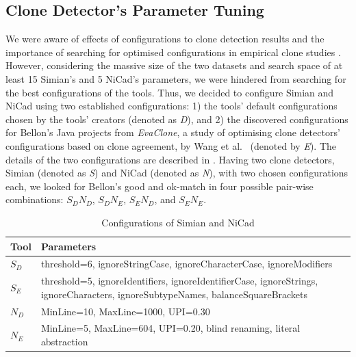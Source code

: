 \documentclass{sig-alternate-05-2015}
\begin{document}
\subsection{Clone Detector's Parameter Tuning}
We were aware of effects of configurations to clone detection results and the importance of searching for optimised configurations in empirical clone studies \cite{Wang2014,cr2016ssbse,Ragkhitwetsagul2016,Svajlenko2014}. However, considering the massive size of the two datasets and search space of at least 15 Simian's and 5 NiCad's parameters, we were hindered from searching for the best configurations of the tools. Thus, we decided to configure Simian and NiCad using two established configurations: 1) the tools' default configurations chosen by the tools' creators (denoted as \textit{D}), and 2) the discovered configurations for Bellon's Java projects from \textit{EvaClone}, a study of optimising clone detectors' configurations based on clone agreement, by Wang et al.~\cite{Wang2013} (denoted by \textit{E}). The details of the two configurations are described in . Having two clone detectors, Simian (denoted as \textit{S}) and NiCad (denoted as \textit{N}), with two chosen configurations each, we looked for Bellon's good and ok-match in four possible pair-wise combinations: $S_{D}N_{D}$, $S_{D}N_{E}$, $S_{E}N_{D}$, and $S_{E}N_{E}$.

\begin{table}
	\centering
	\caption{Configurations of Simian and NiCad}
	\label{t:param_tuning}
	\small
	\begin{tabular}{l|p{5.5cm}}
		\hline 
		Tool & Parameters \\
		\hline
		$S_D$ &  threshold=6, ignoreStringCase, \newline ignoreCharacterCase, ignoreModifiers \\ 
		\hline
		$S_E$ & threshold=5, ignoreIdentifiers, \newline ignoreIdentifierCase, ignoreStrings, \newline ignoreCharacters, ignoreSubtypeNames, \newline balanceSquareBrackets  \\ 
		\hline 
		$N_D$ & MinLine=10, MaxLine=1000, UPI=0.30 \\
		\hline
		$N_E$ & MinLine=5, MaxLine=604, UPI=0.20, \newline blind renaming, literal abstraction \\ 
		\hline 
	\end{tabular} %
\end{table}
\end{document}
